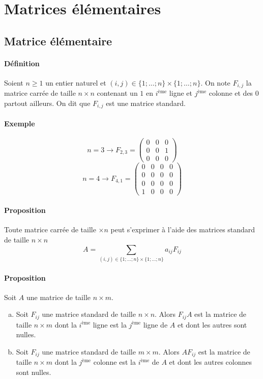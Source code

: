 %
%
\section{Matrices élémentaires}
%
%

%
\subsection{Matrice élémentaire}
%
\paragraph{Définition} Soient $n \geq 1$ un entier naturel et $(i, j) \in \{1; \ldots; n\} \times \{1; \ldots; n\}$. On note $F_{i, j}$ la matrice carrée de taille $n \times n$ contenant un $1$ en $i^{\text{ème}}$ ligne et $j^{\text{ème}}$ colonne et des $0$ partout ailleurs. On dit que $F_{i, j}$ est une matrice standard.

\paragraph{Exemple} 
$$n = 3 \rightarrow F_{2,3} = 
\begin{pmatrix}
  0 & 0 & 0 \\
  0 & 0 & 1 \\
  0 & 0 & 0
\end{pmatrix}$$
$$n = 4 \rightarrow F_{4,1} = 
\begin{pmatrix}
  0 & 0 & 0 & 0 \\
  0 & 0 & 0 & 0 \\
  0 & 0 & 0 & 0 \\
  1 & 0 & 0 & 0
\end{pmatrix}$$

\paragraph{Proposition} Toute matrice carrée de taille $\times n$ peut s'exprimer à l'aide des matrices standard de taille $n\times n$
$$A = \sum_{(i, j) \in \{1; \ldots; n\}\times\{1; \ldots; n\}} a_{ij} F_{ij}$$

\paragraph{Proposition} Soit $A$ une matrice de taille $n\times m$.
\begin{enumerate}[a)]
  \item Soit $F_{ij}$ une matrice standard de taille $n\times n$. Alors $F_{ij} A$ est la matrice de taille $n \times m$ dont la $i^{\text{ème}}$ ligne est la $j^{\text{ème}}$ ligne de $A$ et dont les autres sont nulles.
  \item Soit $F_{ij}$ une matrice standard de taille $m\times m$. Alors $A F_{ij}$ est la matrice de taille $n\times m$ dont la $j^{\text{ème}}$ colonne est la $i^{\text{ème}}$ de $A$ et dont les autres colonnes sont nulles.
\end{enumerate}

